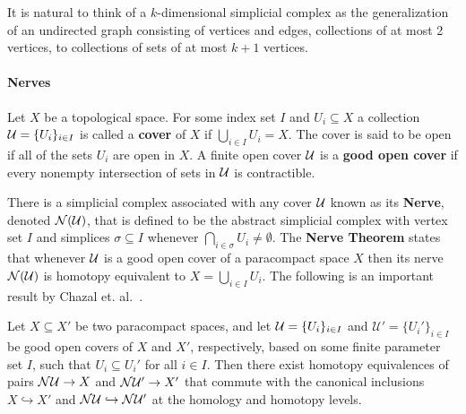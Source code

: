 It is natural to think of a $k$-dimensional simplicial complex as the generalization of an undirected graph consisting of vertices and edges, collections of at most 2 vertices, to collections of sets of at most $k+1$ vertices.

\paragraph{Nerves}


Let $X$ be a topological space.
For some index set $I$ and $U_i\subseteq X$ a collection $\mathcal{U} = \{U_i\}_{i\in I}$ is called a \textbf{cover} of $X$ if $\bigcup_{i\in I} U_i = X$.
The cover is said to be open if all of the sets $U_i$ are open in $X$.
A finite open cover $\mathcal{U}$ is a \textbf{good open cover} if every nonempty intersection of sets in $\mathcal{U}$ is contractible.

There is a simplicial complex associated with any cover $\mathcal{U}$ known as its \textbf{Nerve}, denoted $\mathcal{N}(\mathcal{U})$, that is defined to be the abstract simplicial complex with vertex set $I$ and simplices $\sigma\subseteq I$ whenever $\bigcap_{i\in\sigma} U_i\neq \emptyset$.
The \textbf{Nerve Theorem} states that whenever $\mathcal{U}$ is a good open cover of a paracompact space $X$ then its nerve $\mathcal{N}(\mathcal{U})$ is homotopy equivalent to $X = \bigcup_{i\in I} U_i$.
The following is an important result by Chazal et. al.~\cite{chazal08towards}.

\begin{lemma}\label{lem:pers_nerve}
  Let $X\subseteq X'$ be two paracompact spaces, and let $\mathcal{U} = \{U_i\}_{i\in I}$ and $\mathcal{U}' = \{U_i'\}_{i\in I}$ be good open covers of $X$ and $X'$, respectively, based on some finite parameter set $I$, such that $U_i\subseteq U_i'$ for all $i\in I$.
  Then there exist homotopy equivalences of pairs $\mathcal{N}\mathcal{U}\to X$ and $\mathcal{N}\mathcal{U}'\to X'$ that commute with the canonical inclusions $X \hookrightarrow X'$ and $\mathcal{N}\mathcal{U}\hookrightarrow \mathcal{N}\mathcal{U}'$ at the homology and homotopy levels.
\end{lemma}

